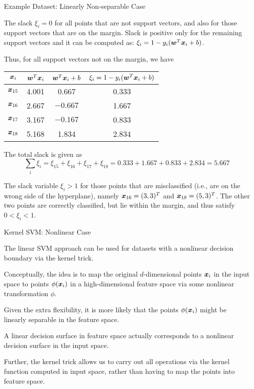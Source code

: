 \begin{frame}{Example Dataset: Linearly Non-separable Case}

The slack $\xi_i = 0$ for all points that are not support
vectors, and also for those support vectors that are on the
margin. Slack is positive only for the remaining support
vectors and it can be computed as:
    $\xi_i = 1 - y_i({\boldsymbol w}^T{\boldsymbol x}_i+b)$.

Thus, for all support vectors not on the margin, we have
\begin{center}\vspace*{10pt}\small
    {\renewcommand{\arraystretch}{1.1}\begin{tabular}{|c|c|c|c|}
        \hline
        ${\boldsymbol x}_i$ & ${\boldsymbol w}^T{\boldsymbol x}_i$ & ${\boldsymbol w}^T{\boldsymbol x}_i + b$ & $\xi_i = 1
        - y_i({\boldsymbol w}^T{\boldsymbol x}_i+b)$\\
        \hline
        ${\boldsymbol x}_{15}$ & 4.001 & 0.667 & 0.333\\
        ${\boldsymbol x}_{16}$ & 2.667 & $-0.667$ & 1.667\\
        ${\boldsymbol x}_{17}$ & 3.167 & $-0.167$ & 0.833\\
        ${\boldsymbol x}_{18}$ & 5.168 & 1.834 & 2.834\\
        \hline
    \end{tabular}}\vspace*{10pt}
\end{center}
The total slack is given as
$$\sum_i \xi_i = \xi_{15} + \xi_{16} + \xi_{17} + \xi_{18} =
0.333+ 1.667 +
0.833 + 2.834 = 5.667$$

The slack variable $\xi_i > 1$ for those points that
are misclassif\/{i}ed (i.e., are on the wrong side of the
hyperplane), namely ${\boldsymbol x}_{16} = (3,3)^T$ and ${\boldsymbol x}_{18} = (5,3)^T$.
The other two points are correctly classif\/{i}ed, but lie within the
margin, and thus satisfy $0 < \xi_i < 1$.
\end{frame}


\ifdefined\wox \begin{frame} \titlepage \end{frame} \fi


\begin{frame}{Kernel SVM: Nonlinear Case}

The linear SVM approach can be used for datasets with a nonlinear
decision boundary via the kernel trick.

\medskip
Conceptually, the idea is to map the
original $d$-dimensional points ${\boldsymbol x}_i$ in the input space to
points $\phi({\boldsymbol x}_i)$ in a high-dimensional feature space via some
nonlinear transformation $\phi$. 

\medskip
Given the extra flexibility, it
is more likely that the points $\phi({\boldsymbol x}_i)$ might be linearly
separable in the feature space. 

\medskip
A linear
decision surface in feature space actually corresponds to a
nonlinear decision surface in the input space. 

\medskip
Further, the kernel
trick allows us to carry out all operations via the kernel
function computed in input space, rather than having to map the
points into feature space.
\end{frame}



